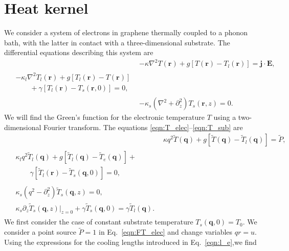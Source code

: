 \documentclass[aps, prb, reprint, superscriptaddress]{revtex4-2}
\renewcommand{\vec}{\mathbf}
\begin{document}
\section{Heat kernel}
\label{appendix:temp_prof}
We consider a system of electrons in graphene thermally coupled to a phonon bath, with the latter in contact with a three-dimensional substrate. 
The differential equations describing this system are 
\begin{align}
	&-\kappa \nabla^2 T(\vec{r}) + g\left[T(\vec{r}) - T_l(\vec{r})\right] = \vec{j}\cdot \vec{E}, \label{eqn:T_elec}\\
		\begin{split} 
		&-\kappa_l \nabla^2 T_l(\vec{r}) + g\left[T_l(\vec{r})- T(\vec{r})\right] \\
		& \qquad + \gamma\left[T_l(\vec{r}) - T_s(\vec{r}, 0)\right] = 0,
		\end{split} \label{eqn:T_phonon}\\
	&-\kappa_s\left(\nabla^2 + \partial_z^2\right)T_s(\vec{r}, z) = 0.\label{eqn:T_sub} 
\end{align}
We will find the Green's function for the electronic temperature $T$ using a two-dimensional Fourier transform. 
The equations \eqref{eqn:T_elec}--\eqref{eqn:T_sub} are 
\begin{align}
	&\kappa q^2 \tilde{T}(\vec{q}) + g\left[\tilde{T}(\vec{q}) - \tilde{T}_l(\vec{q})\right] =  \tilde{P}, \label{eqn:FT_elec}\\
		\begin{split}
	&\kappa_l q^2 \tilde{T}_l(\vec{q}) + g\left[\tilde{T}_l(\vec{q})- \tilde{T}_e(\vec{q})\right]+ \\ 
	 &\qquad \gamma\left[\tilde{T}_l(\vec{r}) - \tilde{T}_s(\vec{q}, 0)\right] = 0, \label{eqn:FT_phonon}
 		\end{split} \\
	\begin{split}
	&\kappa_s\left(q^2 - \partial_z^2\right)\tilde{T}_s(\vec{q}, z) = 0,\\ &{\kappa_s\partial_z \tilde{T}_{s}(\vec{q}, z)\big|_{z = 0} + \gamma \tilde{T}_{s}(\vec{q}, 0) = \gamma \tilde{T}_{l}(\vec{q})}.\label{eqn:FT_sub}
	\end{split}
\end{align}
We first consider the case of constant substrate temperature $T_s(\vec{q}, 0) = T_0$. 
We consider a point source $\tilde{P} = 1$ in Eq.~\eqref{eqn:FT_elec} and change variables $q r = u$. 
Using the expressions for the cooling lengths introduced in Eq.~\eqref{eqn:l_e},we find
\end{document}
